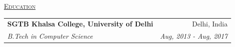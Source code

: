 \documentclass[11pt, a4paper]{article}
\begin{document}
\begin{flushleft}
    \uline{\textsc{\large{Education}}\hfill}
    \newline
    \newline
    \setlength\tabcolsep{0pt}
    \begin{tabularx}{\textwidth}{X r}
        \large{\textbf{SGTB Khalsa College, University of Delhi}} & Delhi, India \\
        \textit{B.Tech in Computer Science} & \textit{Aug, 2013 - Aug, 2017} \\
    \end{tabularx}
    \newline
\end{flushleft}
\end{document}
